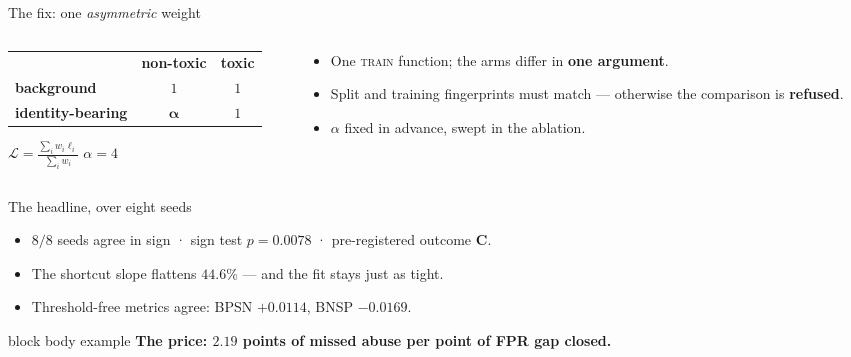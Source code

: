 \documentclass[aspectratio=169,11pt,xcolor={table}]{beamer}
\newcommand{\takeaway}[1]{%
  \vspace{0.6ex}%
  \begin{beamercolorbox}[wd=\textwidth,sep=1.0ex,rounded=true]{block body example}%
    \small\textbf{#1}%
  \end{beamercolorbox}}
\begin{document}
\begin{frame}{The fix: one \emph{asymmetric} weight}
  \vspace{2.6ex}
  \begin{columns}[t,onlytextwidth]
    \begin{column}{0.48\textwidth}
      \centering
      \small
      \renewcommand{\arraystretch}{1.6}
      \begin{tabular}{l|c|c}
        \multicolumn{1}{c}{} & \multicolumn{1}{c}{\textbf{non-toxic}}
          & \multicolumn{1}{c}{\textbf{toxic}} \\ \cline{2-3}
        \textbf{background} & \cellcolor{fairwash}$1$ & \cellcolor{fairwash}$1$ \\ \cline{2-3}
        \textbf{identity-bearing} & \cellcolor{fairgreen!30}$\boldsymbol{\alpha}$
          & \cellcolor{fairwash}$1$ \\ \cline{2-3}
      \end{tabular}

      \vspace{2.2ex}
      $\displaystyle \mathcal{L} = \frac{\sum_i w_i \ell_i}{\sum_i w_i}$
      \qquad $\alpha = 4$
    \end{column}
    \begin{column}{0.46\textwidth}
      \vspace{-1.4ex}
      \small
      \begin{itemize}\itemsep 1.3ex
        \item One \textsc{train} function; the arms differ in \textbf{one
          argument}.
        \item Split and training fingerprints must match --- otherwise the
          comparison is \textbf{refused}.
        \item $\alpha$ fixed in advance, swept in the ablation.
      \end{itemize}
    \end{column}
  \end{columns}
\end{frame}

\begin{frame}{The headline, over eight seeds}
  \vspace{1.8ex}
  \begin{center}
    \small
    \setlength{\tabcolsep}{3pt}
    
  \end{center}
  \vspace{1.8ex}
  \small
  \begin{itemize}\itemsep 1.0ex
    \item $8/8$ seeds agree in sign · sign test $p = 0.0078$ · pre-registered
      outcome \textbf{C}.
    \item The shortcut slope flattens $44.6\%$ --- and the fit stays just as
      tight.
    \item Threshold-free metrics agree: BPSN $+0.0114$, BNSP $-0.0169$.
  \end{itemize}
  \takeaway{The price: $2.19$ points of missed abuse per point of FPR gap
    closed.}
\end{frame}
\end{document}
